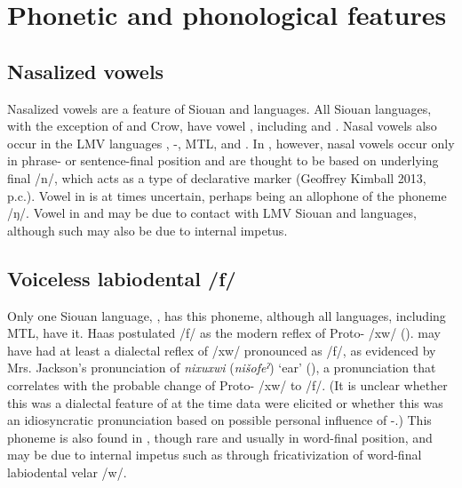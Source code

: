 \documentclass[output=paper]{LSP/langsci}
\begin{document}
\section{Phonetic and phonological features}

\subsection{Nasalized vowels}

Nasalized vowels are a feature of Siouan and  languages. All Siouan languages, with the exception of  and Crow, have vowel , including  and . Nasal vowels also occur in the LMV languages , -, MTL, and . In , however, nasal vowels occur only in phrase- or sentence-final position and are thought to be based on underlying final /n/, which acts as a type of declarative marker (Geoffrey Kimball 2013, p.c.). Vowel  in  is at times uncertain, perhaps being an allophone of the phoneme /ŋ/. Vowel  in  and  may be due to contact with LMV Siouan and  languages, although such  may also be due to internal impetus.

\subsection{Voiceless labiodental  /f/}

Only one Siouan language, , has this phoneme, although all  languages, including MTL, have it. Haas postulated  /f/ as the modern reflex of Proto- /xw/ (\citeyear[36]{Haas1969}).  may have had at least a dialectal reflex of /xw/ pronounced as /f/, as evidenced by Mrs. Jackson’s pronunciation of \emph{nixuxwi} (\emph{nišofeˀ}) `ear' (\citealt[79]{HaasSwadesh1968}), a pronunciation that correlates with the probable change of Proto- /xw/ to /f/. (It is unclear whether this was a dialectal feature of  at the time data were elicited or whether this was an idiosyncratic pronunciation based on possible personal influence of -.) This phoneme is also found in , though rare and usually in word-final position, and may be due to internal impetus such as through fricativization of word-final labiodental velar /w/.
\end{document}
